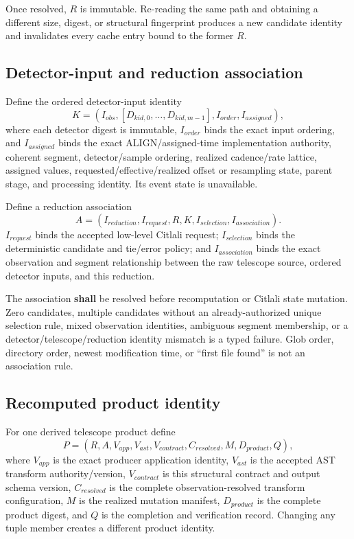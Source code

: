 \documentclass[11pt]{article}
\newcommand{\shall}{\textbf{shall}}
\begin{document}
Once resolved, $R$ is immutable.  Re-reading the same path and obtaining a
different size, digest, or structural fingerprint produces a new candidate
identity and invalidates every cache entry bound to the former $R$.

\subsection{Detector-input and reduction association}

Define the ordered detector-input identity
\[
K = (I_{obs}, [D_{kid,0},\ldots,D_{kid,m-1}], I_{order}, I_{assigned}),
\]
where each detector digest is immutable, $I_{order}$ binds the exact input
ordering, and $I_{assigned}$ binds the exact ALIGN/assigned-time implementation
authority, coherent segment, detector/sample ordering, realized cadence/rate
lattice, assigned values, requested/effective/realized offset or resampling
state, parent stage, and processing identity.  Its event state is unavailable.

Define a reduction association
\[
A = (I_{reduction}, I_{request}, R, K, I_{selection}, I_{association}).
\]
$I_{request}$ binds the accepted low-level Citlali request; $I_{selection}$
binds the deterministic candidate and tie/error policy; and
$I_{association}$ binds the exact observation and segment relationship between
the raw telescope source, ordered detector inputs, and this reduction.

The association \shall{} be resolved before recomputation or Citlali state
mutation.  Zero candidates, multiple candidates without an already-authorized
unique selection rule, mixed observation identities, ambiguous segment
membership, or a detector/telescope/reduction identity mismatch is a typed
failure.  Glob order, directory order, newest modification time, or ``first
file found'' is not an association rule.

\subsection{Recomputed product identity}

For one derived telescope product define
\[
P = (R,A,V_{app},V_{ast},V_{contract},C_{resolved},M,D_{product},Q),
\]
where $V_{app}$ is the exact producer application identity, $V_{ast}$ is the
accepted AST transform authority/version, $V_{contract}$ is this structural
contract and output schema version, $C_{resolved}$ is the complete
observation-resolved transform configuration, $M$ is the realized mutation
manifest, $D_{product}$ is the complete product digest, and $Q$ is the
completion and verification record.  Changing any tuple member creates a
different product identity.
\end{document}
